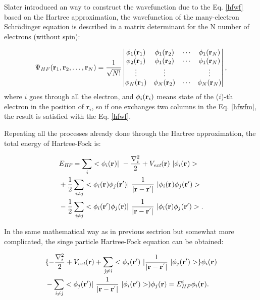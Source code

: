 \documentclass[a4paper, 12pt, titlepage,oneside,drop]{kthesis}
\begin{document}
Slater introduced an way to construct the wavefunction due to the Eq. \ref{hfwf} based on the Hartree approximation, 
the wavefunction of the many-electron Schrödinger equation is described in a matrix determinant for the N number of electrons 
(without spin):

\begin{equation}\label{hfwfm}
\Psi_{HF}(\mathbf{r}_1, \mathbf{r}_2, \ldots, \mathbf{r}_N) =
\frac{1}{\sqrt{N!}} \left|
\begin{matrix}
    \bwf<1><1> & \bwf<1><2> & \cdots & \bwf<1><N> \\
    \bwf<2><1> & \bwf<1><2> & \cdots & \bwf<1><N> \\
    \vdots               & \vdots               &        & \vdots               \\
    \bwf<N><1> & \bwf<N><2> & \cdots & \bwf<N><N>
\end{matrix} \right|,
\end{equation}
\noindent where $i$ goes through all the electron, and $\bwf<i><i>$ means state of the ($i$)-th electron in the position of $\textbf{r}_\textit{i}$, so if one exchanges two columns
 in the Eq. \ref{hfwfm}, the result is satisfied with the Eq. \ref{hfwf}.

Repeating all the processes already done through the Hartree approximation, the total energy of Hartree-Fock is:

\begin{equation}\begin{split}
&E_\textit{HF} = \sumi<i> <\bwf<i><> |\ -\frac{\nabla^{2}_{i}}{2} + V_\textit{ext}(\textbf{r})  \ | \bwf<i><> > \\
& + \frac{1}{2} \suminj<i><j> <\bwf<i><> \bwfn<j><'>|\ \frac{1}{|\textbf{r} - \textbf{r}^{'} |} \ | \bwf<i><> \bwfn<j><'>> \\
& - \frac{1}{2} \suminj<i><j> <\bwfn<i><'> \bwfn<j><>|\ \frac{1}{|\textbf{r} - \textbf{r}^{'} |} \ | \bwfn<i><> \bwfn<j><'>>.
\end{split}\end{equation}

In the same mathematical way as in previous sectrion but somewhat more complicated, the singe particle Hartree-Fock equation can be obtained:

\begin{equation}\begin{split}
& \{ -\frac{\nabla^{2}_{\textit i}}{2} + V_\textit{ext}(\textbf{r})+ \suminj<j><i> <\bwfn<j><'>\ | \frac{1}{|\textbf{r} - \textbf{r}^{'} |} \ | \bwfn<j><'>> \} \bwf<i><>  \\
& - \suminj<i><j>  < \bwfn<j><'>|\ \frac{1}{|\textbf{r} - \textbf{r}^{'} |} \ | \bwfn<i><'> >) \bwfn<j><>  = E^{i}_{HF} \bwf<i><>.
\end{split}\end{equation}
\end{document}
